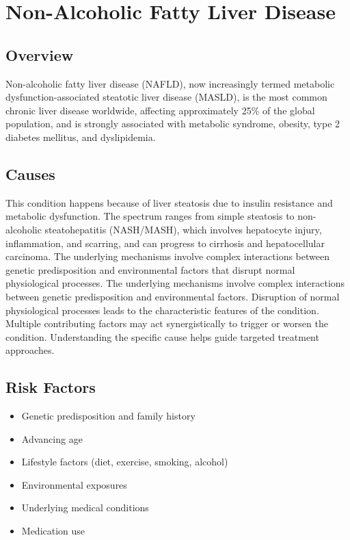 \chapter{Non-Alcoholic Fatty Liver Disease}
\label{sec:Non-Alcoholic Fatty Liver Disease}

\section{Overview}
Non-alcoholic fatty liver disease (NAFLD), now increasingly termed metabolic dysfunction-associated steatotic liver disease (MASLD), is the most common chronic liver disease worldwide, affecting approximately 25\% of the global population, and is strongly associated with metabolic syndrome, obesity, type 2 diabetes mellitus, and dyslipidemia.
\section{Causes}
This condition happens because of liver steatosis due to insulin resistance and metabolic dysfunction. The spectrum ranges from simple steatosis to non-alcoholic steatohepatitis (NASH/MASH), which involves hepatocyte injury, inflammation, and scarring, and can progress to cirrhosis and hepatocellular carcinoma. The underlying mechanisms involve complex interactions between genetic predisposition and environmental factors that disrupt normal physiological processes. The underlying mechanisms involve complex interactions between genetic predisposition and environmental factors. Disruption of normal physiological processes leads to the characteristic features of the condition. Multiple contributing factors may act synergistically to trigger or worsen the condition. Understanding the specific cause helps guide targeted treatment approaches.
\section{Risk Factors}


\begin{itemize}[noitemsep]
  \item Genetic predisposition and family history
  \item Advancing age
  \item Lifestyle factors (diet, exercise, smoking, alcohol)
  \item Environmental exposures
  \item Underlying medical conditions
  \item Medication use
\end{itemize}
